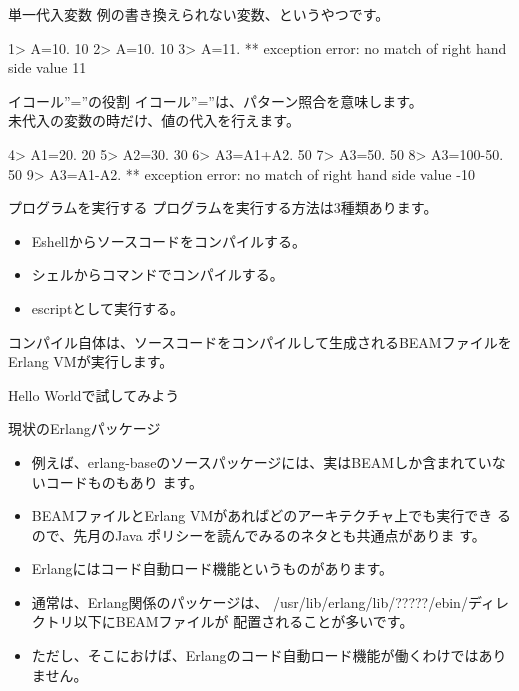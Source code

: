 \begin{frame}[containsverbatim]{単一代入変数}
例の書き換えられない変数、というやつです。
 \begin{commandline}
  1> A=10.
  10
  2> A=10.
  10
  3> A=11.
  ** exception error: no match of right hand side value 11
 \end{commandline}
\end{frame}

\begin{frame}[containsverbatim]{イコール''=''の役割}
イコール''=''は、パターン照合を意味します。\\
未代入の変数の時だけ、値の代入を行えます。
 \begin{commandline}
  4> A1=20.
  20
  5> A2=30.
  30
  6> A3=A1+A2.
  50
  7> A3=50.
  50
  8> A3=100-50.
  50
  9> A3=A1-A2.
  ** exception error: no match of right hand side value -10
 \end{commandline}
\end{frame}

\begin{frame}{プログラムを実行する}
プログラムを実行する方法は3種類あります。
 \begin{itemize}
  \item Eshellからソースコードをコンパイルする。
  \item シェルからコマンドでコンパイルする。
  \item escriptとして実行する。
 \end{itemize}
 コンパイル自体は、ソースコードをコンパイルして生成されるBEAMファイルを
 Erlang VMが実行します。
\end{frame}

\begin{frame}{Hello Worldで試してみよう}

 
\end{frame}

\begin{frame}{現状のErlangパッケージ}
 \begin{itemize}
  \item 例えば、erlang-baseのソースパッケージには、実はBEAMしか含まれていないコードものもあり
	ます。
  \item BEAMファイルとErlang VMがあればどのアーキテクチャ上でも実行でき
	るので、先月のJava ポリシーを読んでみるのネタとも共通点がありま
	す。
  \item Erlangにはコード自動ロード機能というものがあります。
  \item 通常は、Erlang関係のパッケージは、
	/usr/lib/erlang/lib/?????/ebin/ディレクトリ以下にBEAMファイルが
	配置されることが多いです。
  \item ただし、そこにおけば、Erlangのコード自動ロード機能が働くわけではありません。
 \end{itemize}
\end{frame}

